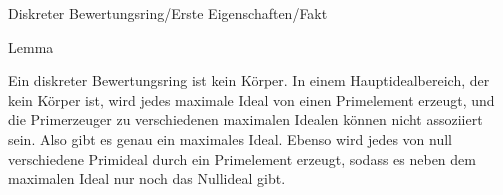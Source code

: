 
{Diskreter Bewertungsring/Erste Eigenschaften/Fakt}

{Lemma}

{}

{


\faktsituation {}



\faktzusatz {}

\faktzusatz {}


}

{ Ein diskreter Bewertungsring ist kein Körper. In einem Hauptidealbereich, der kein Körper ist, wird jedes maximale Ideal von einen Primelement erzeugt, und die Primerzeuger zu verschiedenen maximalen Idealen können nicht assoziiert sein. Also gibt es genau  ein maximales Ideal. Ebenso wird jedes von null verschiedene Primideal durch ein Primelement erzeugt, sodass es neben dem maximalen Ideal nur noch das Nullideal gibt. }



